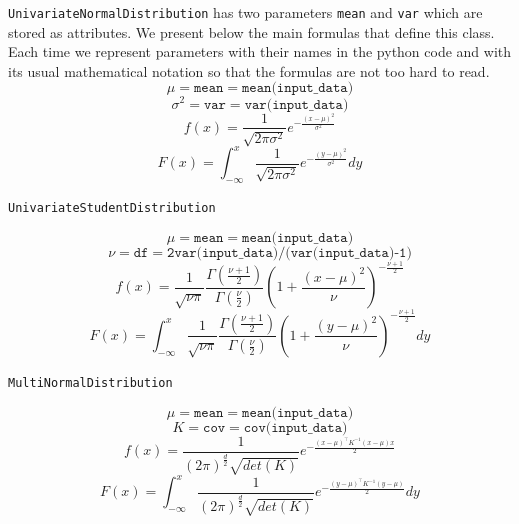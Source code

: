 \documentclass{article}
\begin{document}
  \texttt{UnivariateNormalDistribution} has two parameters \texttt{mean} and \texttt{var} which are stored as attributes. We present below the main formulas that define this class. Each time we represent parameters with their names in the python code and with its usual mathematical notation so that the formulas are not too hard to read.
  	\begin{equation*}
  	\mu = \texttt{mean} =  \texttt{mean(input\_data})
  	\end{equation*}
  	\begin{equation*}
  	\sigma^2 = \texttt{var} = \texttt{var(input\_data})
  	\end{equation*}
  	\begin{equation*}
  	f(x) = \frac{1}{\sqrt{2\pi \sigma^2}}e^{-\frac{(x-\mu)^2}{\sigma^2}}
  	\end{equation*}
  	\begin{equation*}
  	F(x) = \int_{-\infty}^x \frac{1}{\sqrt{2\pi\sigma^2}}e^{-\frac{(y-\mu)^2}{\sigma^2}}dy
  	\end{equation*}
  	
  	\texttt{UnivariateStudentDistribution}
  	
  	\begin{equation*}
  	\mu = \texttt{mean} = \texttt{mean(input\_data)}
  	\end{equation*}
  	\begin{equation*}
  	\nu = \texttt{df} = \texttt{2var(input\_data)/(var(input\_data)-1)}
  	\end{equation*}
  	\begin{equation*}
  	f(x) = \frac{1}{\sqrt{\nu\pi}}\frac{\Gamma(\frac{\nu+1}{2})}{\Gamma(\frac{\nu}{2})}\left(1+\frac{(x-\mu)^2}{\nu}\right)^{-\frac{\nu+1}{2}}
  	\end{equation*}
  	\begin{equation*}
  	F(x) = \int_{-\infty}^x \frac{1}{\sqrt{\nu\pi}}\frac{\Gamma(\frac{\nu+1}{2})}{\Gamma(\frac{\nu}{2})}\left(1+\frac{(y-\mu)^2}{\nu}\right)^{-\frac{\nu+1}{2}}dy
  	\end{equation*}
	 
	 
	 \texttt{MultiNormalDistribution}
	 
  	\begin{equation*}
  	\mu = \texttt{mean} = \texttt{mean(input\_data)}
  	\end{equation*}
  	\begin{equation*}
  	K = \texttt{cov} = \texttt{cov(input\_data)}
  	\end{equation*}
  	\begin{equation*}
  	f(x) = \frac{1}{(2\pi)^{\frac{d}{2}}\sqrt{det(K)}}e^{-\frac{(x-\mu)^\top K^{-1} (x-\mu)x}{2}}
  	\end{equation*}
  	\begin{equation*}
  	F(x) = \int_{-\infty}^x \frac{1}{(2\pi)^{\frac{d}{2}}\sqrt{det(K)}}e^{-\frac{(y-\mu)^\top K^{-1} (y-\mu)}{2}}dy
  	\end{equation*}
  	
\end{document}
